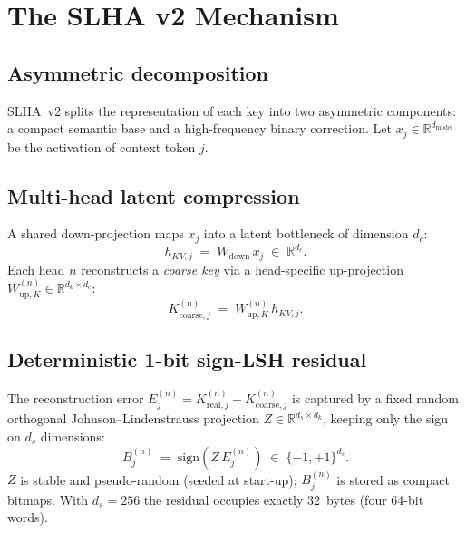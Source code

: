 \documentclass[11pt]{article}
\theoremstyle{plain}
\theoremstyle{definition}
\newcommand{\dc}{d_c}
\newcommand{\ds}{d_s}
\newcommand{\dk}{d_k}
\newcommand{\sign}{\mathrm{sign}}
\begin{document}
\section{The SLHA v2 Mechanism}
\label{sec:method}

\subsection{Asymmetric decomposition}
SLHA~v2 splits the representation of each key into two asymmetric
components: a compact semantic base and a high-frequency binary
correction. Let $x_j \in \mathbb{R}^{d_{\text{model}}}$ be the
activation of context token $j$.

\subsection{Multi-head latent compression}
A shared down-projection maps $x_j$ into a latent bottleneck of
dimension $\dc$:
\begin{equation}
  h_{KV,j} \;=\; W_{\text{down}}\, x_j \;\in\; \mathbb{R}^{\dc}.
\end{equation}
Each head $n$ reconstructs a \emph{coarse key} via a head-specific
up-projection $W_{\text{up},K}^{(n)} \in \mathbb{R}^{\dk \times \dc}$:
\begin{equation}
  K_{\text{coarse},j}^{(n)} \;=\; W_{\text{up},K}^{(n)}\, h_{KV,j}.
\end{equation}

\subsection{Deterministic 1-bit sign-LSH residual}
The reconstruction error
$E_j^{(n)} = K_{\text{real},j}^{(n)} - K_{\text{coarse},j}^{(n)}$ is
captured by a fixed random orthogonal Johnson--Lindenstrauss projection
$Z \in \mathbb{R}^{\ds \times \dk}$, keeping only the sign on $\ds$
dimensions:
\begin{equation}
  B_j^{(n)} \;=\; \sign\!\left( Z\, E_j^{(n)} \right) \;\in\; \{-1,+1\}^{\ds}.
\end{equation}
$Z$ is stable and pseudo-random (seeded at start-up); $B_j^{(n)}$ is
stored as compact bitmaps. With $\ds = 256$ the residual occupies
exactly 32~bytes (four 64-bit words).
\end{document}
